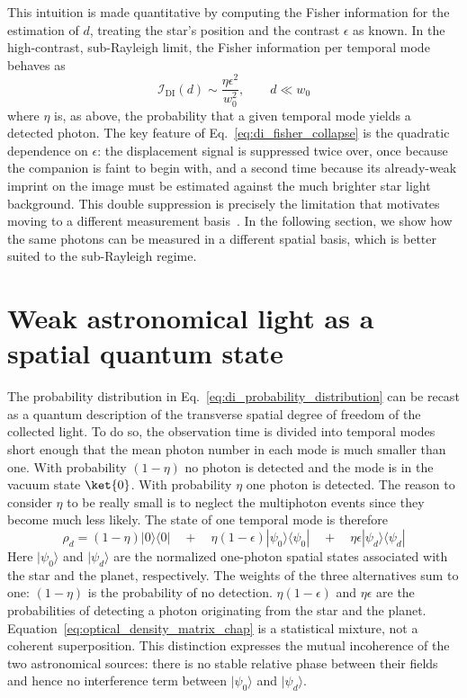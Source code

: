 This intuition is made quantitative by computing the Fisher information for the estimation of $d$, treating the star's position and the contrast $\epsilon$ as known. In the high-contrast, sub-Rayleigh limit, the Fisher information per temporal mode behaves as
\begin{equation}
    \mathcal{I}_{\mathrm{DI}}(d) \sim \frac{\eta\epsilon^2}{w_0^2},
    \qquad d\ll w_0
    \label{eq:di_fisher_collapse}
\end{equation}
where $\eta$ is, as above, the probability that a given temporal mode yields a detected photon. The key feature of Eq.~\eqref{eq:di_fisher_collapse} is the quadratic dependence on $\epsilon$: the displacement signal is suppressed twice over, once because the companion is faint to begin with, and a second time because its already-weak imprint on the image must be estimated against the much brighter star light background. This double suppression is precisely the limitation that motivates moving to a different measurement basis~\cite{Santamaria2024single,Tsang2016quantum}. In the following section, we show how the same photons can be measured in a different spatial basis, which is better suited to the sub-Rayleigh regime.

\section{Weak astronomical light as a spatial quantum state}
\label{sec:weak_light_as_quantum_state}

The probability distribution in Eq.~\eqref{eq:di_probability_distribution} can be recast as a quantum description of the transverse spatial degree of freedom of the collected light.  To do so, the observation time is divided into temporal modes short enough that the mean photon number in each mode is much smaller than one.  With probability $(1-\eta)$ no photon is detected and the mode is in the vacuum state $\ket{0}$. With probability $\eta$ one photon is detected.  The reason to consider $\eta$ to be really small is to neglect the multiphoton events since they become much less likely. The state of one temporal mode is therefore~\cite{Santamaria2024single}
\begin{equation}
    \rho_d=(1-\eta)|0\rangle\langle0|
    \quad +\quad  \eta(1-\epsilon)|\psi_0\rangle\langle\psi_0|
    \quad +\quad  \eta\epsilon|\psi_d\rangle\langle\psi_d|
    \label{eq:optical_density_matrix_chap}
\end{equation}
Here $|\psi_0\rangle$ and $|\psi_d\rangle$ are the normalized one-photon spatial states associated with the star and the planet, respectively.  The weights of the three alternatives sum to one: $(1-\eta)$ is the probability of no detection.
$\eta(1-\epsilon)$ and $\eta\epsilon$ are the probabilities of detecting a photon originating from the star and the planet.  Equation~\eqref{eq:optical_density_matrix_chap} is a statistical mixture, not a coherent superposition.  This distinction expresses the mutual incoherence of the two astronomical sources: there is no stable relative phase between their fields and hence no interference term between $|\psi_0\rangle$ and $|\psi_d\rangle$.

